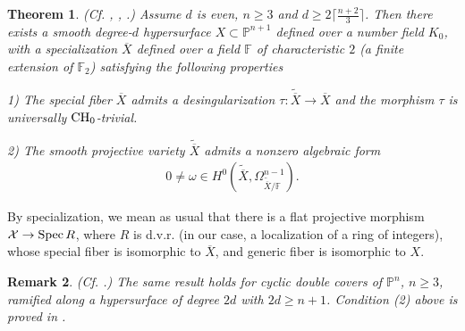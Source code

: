 \documentclass[10pt]{article}
\newtheorem{theo}{Theorem}[section]
\newtheorem{rema}[theo]{Remark}
\begin{document}
\begin{theo} (Cf. \cite{kollar}, \cite[Section V.5]{kollarbook},  \cite{totaro}.) \label{theototaro} Assume $d$ is even, $n\geq 3$ and $d\geq 2\lceil\frac{n+2}{3}\rceil$. Then there exists a smooth degree-$d$ hypersurface $X\subset \mathbb{P}^{n+1}$ defined over a number field $K_0$, with a specialization $\overline{X}$ defined over a field $\mathbb{F}$ of characteristic $2$ (a finite extension of $\mathbb{F}_2$)  satisfying the following properties

1) The special fiber  $\overline{X}$ admits a desingularization
$\tau:\widetilde{\overline{X}}\rightarrow \overline{X}$ and the morphism $\tau$ is universally ${\rm CH}_0$-trivial.

2) The smooth projective variety $\widetilde{\overline{X}}$ admits a nonzero algebraic form
\begin{eqnarray}\label{eqomegasurXbartilde} 0\not=\omega\in H^0(\widetilde{\overline{X}},\Omega_{\widetilde{\overline{X}}/\mathbb{F}}^{n-1}).
\end{eqnarray}

\end{theo}
By specialization, we mean as usual that there is a flat projective morphism $\mathcal{X}\rightarrow {\rm Spec}\,R$, where $R$ is  d.v.r.  (in our case, a localization of a ring of  integers), whose special fiber is isomorphic to $\overline{X}$, and generic fiber is isomorphic to $X$.
\begin{rema}\label{remadouble} (Cf. \cite{CTPiIzvestya}.) {\rm The same result holds for cyclic double covers of $\mathbb{P}^n$, $n\geq 3$, ramified along a hypersurface of degree $2d$ with $2d\geq n+1$. Condition (2) above is proved in
\cite[Proposition 5.10]{kollarbook}.}
\end{rema}
\end{document}
